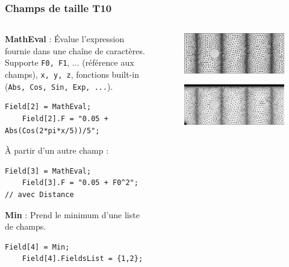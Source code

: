 \documentclass[aspectratio=169]{beamer}
\begin{document}
\begin{frame}[fragile]
\frametitle{Champs de taille \hfill T10}
\begin{columns}
  \begin{column}{0.65\textwidth}
    \footnotesize
    \textbf{MathEval} : Évalue l'expression fournie dans une chaîne de caractères. Supporte \texttt{F0, F1}, ... (référence aux champs), \texttt{x, y, z}, fonctions built-in (\texttt{Abs, Cos, Sin, Exp, ...}).
    \begin{lstlisting}[frame=none,aboveskip=2mm,belowskip=1mm]
    Field[2] = MathEval;
    Field[2].F = "0.05 + Abs(Cos(2*pi*x/5))/5";
    \end{lstlisting}
    À partir d'un autre champ :
    \begin{lstlisting}[frame=none,aboveskip=0mm,belowskip=3mm,escapechar=ß]
    Field[3] = MathEval;
    Field[3].F = "0.05 + F0^2"; // avec Distance
    \end{lstlisting}
    \textbf{Min} : Prend le minimum d'une liste de champs.
    \begin{lstlisting}[frame=none,aboveskip=2mm,belowskip=1mm]
    Field[4] = Min;
    Field[4].FieldsList = {1,2};
    \end{lstlisting}
  \end{column}
  \begin{column}{0.35\textwidth}
    \vspace{0.4cm}
    \begin{figure}
      \text{~~~}
      \includegraphics[width=1.02\textwidth]{figures/cosBW.png}
      \caption{}
      \label{}
    \end{figure}
    \vspace{-0.8cm}
    \begin{figure}
      \text{~~~}
      \includegraphics[width=1.02\textwidth]{figures/min.png}
      \caption{}
      \label{}
    \end{figure}
  \end{column}
\end{columns}
\end{frame}
\end{document}
